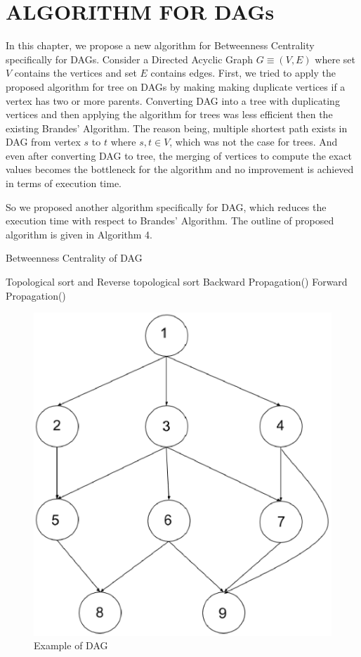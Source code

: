 \chapter{ALGORITHM FOR DAGs}
\label{chap:sup}
 
In this chapter, we propose a new algorithm for Betweenness Centrality specifically for DAGs. 
Consider a Directed Acyclic Graph $G \equiv (V,E)$ where set $V$ contains the vertices and set $E$ contains edges. 
First, we tried to apply the proposed algorithm for tree on DAGs by making making duplicate vertices if a vertex has two or more parents. Converting DAG into a tree with duplicating vertices and then applying the algorithm for trees was less efficient then the existing Brandes' Algorithm. The reason being, multiple shortest path exists in DAG from vertex $s$ to $t$ where $s, t \in V$, which was not the case for trees. And even after converting DAG to tree, the merging of vertices to compute the exact values becomes the bottleneck for the algorithm and no improvement is achieved in terms of execution time.   

So we proposed another algorithm specifically for DAG, which reduces the execution time with respect to Brandes' Algorithm. The outline of proposed algorithm is given in Algorithm 4.
\vspace{1em}
\begin{algorithm}
\caption{Betweenness Centrality of DAG}
Topological sort and Reverse topological sort\;
Backward Propagation()\;
Forward Propagation()\;
\end{algorithm}

\begin{figure}
\centering
\includegraphics[width=13cm]{images/exampledag.eps}
\caption{Example of DAG}
\label{fig:exdag}
\end{figure}

